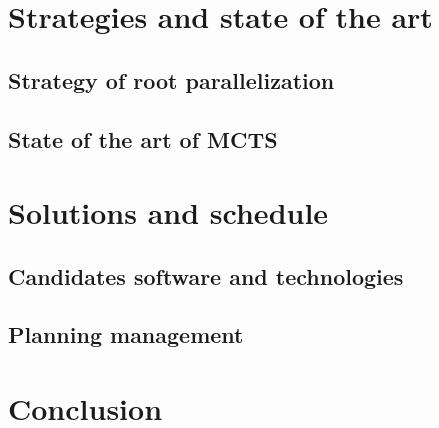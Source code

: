 \documentclass[12pt]{article}
\begin{document}
\newpage
\section{Strategies and state of the art}
\subsection{Strategy of root parallelization}
\subsection{State of the art of MCTS}

\newpage
\section{Solutions and schedule}
\subsection{Candidates software and technologies}
\subsection {Planning management} 
\newpage
\section{Conclusion}

\newpage


\end{document}
